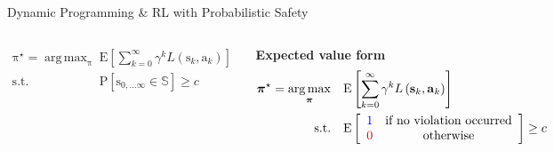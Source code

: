 \documentclass[lecture]{beamer}
\DeclareMathOperator*{\argmax}{arg\,max}
\newcommand{\vect}[1]{\ensuremath{\boldsymbol{\mathrm{#1}}}}
\begin{document}
\begin{frame}{\normalsize Dynamic Programming \& RL with Probabilistic Safety}
\footnotesize
\begin{columns}[t]
\begin{columns}[t]


\begin{alertblock}{}
\vspace{-.2cm}
\begin{align*}
\vect\pi^\star = \argmax_{\vect\pi}&\quad\mathrm E\left[ \sum_{k=0}^\infty \gamma^kL\left(\vect s_k,\vect a_k\right)\right]\\
\mathrm{s.t.}&\quad \mathrm{P}\left[ \vect s_{0,\ldots\infty}\in \mathbb S\right] \geq c
\end{align*}
\end{alertblock}
\end{columns}
\begin{block}{}
\textbf{Expected value form} 
\vspace{-.2cm}
\begin{align*}
\vect\pi^\star = \argmax_{\vect\pi}&\quad\mathrm E\left[ \sum_{k=0}^\infty \gamma^kL\left(\vect s_k,\vect a_k\right)\right]\\
\mathrm{s.t.}&\quad \mathrm{E}\left[ \begin{array}{cc}\textcolor{blue}{1}&\text{if no violation occurred}\\\textcolor{myRed}{0}&\text{otherwise}\end{array} \right] \geq c
\end{align*}
\end{block}


\end{columns}
\end{frame}
\end{document}
